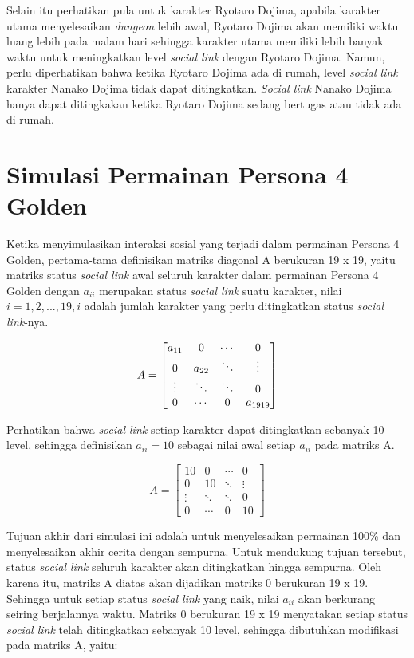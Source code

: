 Selain itu perhatikan pula untuk karakter Ryotaro Dojima, apabila karakter utama menyelesaikan \textit{dungeon} lebih awal, Ryotaro Dojima akan memiliki waktu luang lebih pada malam hari sehingga karakter utama memiliki lebih banyak waktu untuk meningkatkan level \textit{social link} dengan Ryotaro Dojima. Namun, perlu diperhatikan bahwa ketika Ryotaro Dojima ada di rumah, level \textit{social link} karakter Nanako Dojima tidak dapat ditingkatkan. \textit{Social link} Nanako Dojima hanya dapat ditingkakan ketika Ryotaro Dojima sedang bertugas atau tidak ada di rumah.


\section{Simulasi Permainan Persona 4 Golden}
Ketika menyimulasikan interaksi sosial yang terjadi dalam permainan Persona 4 Golden, pertama-tama definisikan matriks diagonal A berukuran 19 x 19, yaitu matriks status \textit{social link} awal seluruh karakter dalam permainan Persona 4 Golden dengan $a_{ii}$ merupakan status \textit{social link} suatu karakter, nilai $i = 1,2,...,19, i$ adalah jumlah karakter yang perlu ditingkatkan status \textit{social link}-nya.

\[
    A =
    \begin{bmatrix}
        a_{11} & 0      & \cdots & 0                \\
        0      & a_{22} & \ddots & \vdots           \\
        \vdots & \ddots & \ddots & 0                \\
        0      & \cdots & 0      & a_{19 \space 19}
    \end{bmatrix}
\]

Perhatikan bahwa \textit{social link} setiap karakter dapat ditingkatkan sebanyak 10 level, sehingga definisikan $a_{ii}= 10$ sebagai nilai awal setiap $a_{ii}$ pada matriks A.

\[
    A =
    \begin{bmatrix}
        10     & 0      & \cdots & 0      \\
        0      & 10     & \ddots & \vdots \\
        \vdots & \ddots & \ddots & 0      \\
        0      & \cdots & 0      & 10
    \end{bmatrix}
\]

Tujuan akhir dari simulasi ini adalah untuk menyelesaikan permainan 100\% dan menyelesaikan akhir cerita dengan sempurna. Untuk mendukung tujuan tersebut, status \textit{social link} seluruh karakter akan ditingkatkan hingga sempurna.
Oleh karena itu, matriks A diatas akan dijadikan matriks 0 berukuran 19 x 19. Sehingga untuk setiap status \textit{social link} yang naik, nilai $a_{ii}$ akan berkurang seiring berjalannya waktu. Matriks 0 berukuran 19 x 19 menyatakan setiap status \textit{social link} telah ditingkatkan sebanyak 10 level, sehingga dibutuhkan modifikasi pada matriks A, yaitu:

